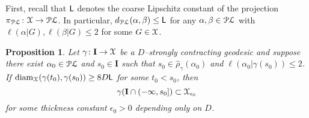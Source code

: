 \documentclass[letterpaper,fleqn]{article}
\theoremstyle{plain}
\newtheorem{proposition}[theorem]{Proposition}
\theoremstyle{definition}
\DeclareMathOperator{\diam}{diam}
\newcommand{\pl}{{\EuScript{PL}}} %
\newcommand{\os}{{\EuScript X}} %
\newcommand{\X}{\os}
\newcommand{\plproj}{\pi_\pl} %
\newcommand{\len}{\ell}  %
\newcommand{\lipconst}{{\sf L}} %
\renewcommand{\diam}{\mathrm{diam}}
\newcommand{\I}{\mathbf{I}}
\begin{document}
First, recall that $\lipconst$ denotes the coarse Lipschitz constant of the projection $\plproj\colon \X \to \pl$. In particular, $d_\pl (\alpha,\beta) \le \lipconst$ for any $\alpha,\beta \in \pl$ with $\ell(\alpha|G), \ell(\beta|G) \le 2$ for some $G \in \X$.

\begin{proposition}\label{prop:bacl_up}
Let $\gamma\colon \I\to \os$ be a $D$--strongly contracting geodesic and suppose there exist $\alpha_0 \in \pl$ and $s_0 \in \I$ such that $s_0 \in \hat{\rho}_\gamma(\alpha_0)$ and $\len(\alpha_0\vert\gamma(s_0)) \le 2$. If $\diam_\os(\gamma(t_0),\gamma(s_0)) \ge 8D\lipconst$ for some $t_0 < s_0$, then 
\[\gamma(\I\cap (-\infty,s_0])\subset\os_{\epsilon_0}\]
 for some thickness constant $\epsilon_0 > 0$ depending only on $D$.
\end{proposition}
\end{document}

